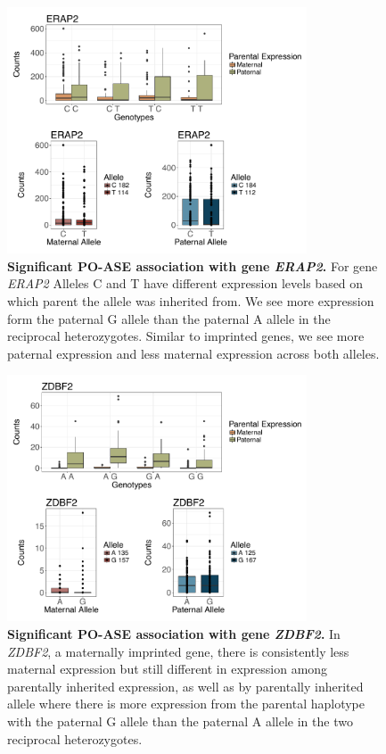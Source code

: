 \begin{figure}[!htb]
\centering \includegraphics[width=3.5in]{img/ch04/ERAP2.pdf}
\caption[Significant PO-ASE association with gene \emph{ERAP2}.]{\textbf{Significant PO-ASE association with gene \emph{ERAP2}.} For gene \emph{ERAP2} Alleles C and T have different expression levels based on which parent the allele was inherited from. We see more expression form the paternal G allele than the paternal A allele in the reciprocal heterozygotes. Similar to imprinted genes, we see more paternal expression and less maternal expression across both alleles.  }
\label{fig:ERAP2}
\end{figure}


\begin{figure}[!htb]
\centering \includegraphics[width=3.5in]{img/ch04/ZDBF2.pdf}
\caption[Significant PO-ASE association with gene \emph{ZDBF2}.]{\textbf{Significant PO-ASE association with gene \emph{ZDBF2}.} In \emph{ZDBF2}, a maternally imprinted gene, there is consistently less maternal expression but still different in expression among parentally inherited expression, as well as by parentally inherited allele where there is more expression from the parental haplotype with the paternal G allele than the paternal A allele in the two reciprocal heterozygotes. }
\label{fig:ZDBF2}
\end{figure}
\clearpage

